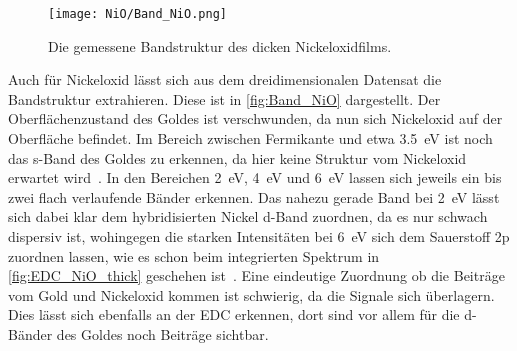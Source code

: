         \begin{figure}
            \centering
            \texttt{[image: NiO/Band\_NiO.png]}
            \caption{Die gemessene Bandstruktur des dicken Nickeloxidfilms.}
            \label{fig:Band_NiO}
        \end{figure}
        Auch für Nickeloxid lässt sich aus dem dreidimensionalen Datensat die Bandstruktur extrahieren.
        Diese ist in \autoref{fig:Band_NiO} dargestellt. %
        Der Oberflächenzustand des Goldes ist verschwunden, da nun sich Nickeloxid auf der Oberfläche befindet.
        Im Bereich zwischen Fermikante und etwa \SI{3.5}{\electronvolt} ist noch das s-Band des Goldes zu erkennen, da hier keine Struktur vom Nickeloxid erwartet wird~\cite{NiO_12}.
        In den Bereichen \SI{2}{\electronvolt}, \SI{4}{\electronvolt} und \SI{6}{\electronvolt} lassen sich jeweils ein bis zwei flach verlaufende Bänder erkennen.
        Das nahezu gerade Band bei \SI{2}{\electronvolt} lässt sich dabei klar dem hybridisierten Nickel d-Band zuordnen, da es nur schwach dispersiv ist, wohingegen die starken Intensitäten bei \SI{6}{\electronvolt} sich dem Sauerstoff 2p zuordnen lassen, wie es schon beim integrierten Spektrum in \autoref{fig:EDC_NiO_thick} geschehen ist~\cite{Hüfner}.
        Eine eindeutige Zuordnung ob die Beiträge vom Gold und Nickeloxid kommen ist schwierig, da die Signale sich überlagern. %
        Dies lässt sich ebenfalls an der EDC erkennen, dort sind vor allem für die d-Bänder des Goldes noch Beiträge sichtbar.
        
    \FloatBarrier
